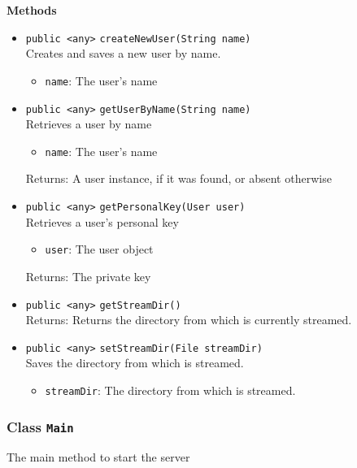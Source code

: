 \textbf{Methods}
\begin{itemize}
\item \lstinline|public <any>| \lstinline|createNewUser|\lstinline|(String name)|\\
Creates and saves a new user by name.
\begin{itemize}
\item \lstinline|name|: The user's name
\end{itemize}



\item \lstinline|public <any>| \lstinline|getUserByName|\lstinline|(String name)|\\
Retrieves a user by name
\begin{itemize}
\item \lstinline|name|: The user's name
\end{itemize}

Returns: A user instance, if it was found, or absent otherwise

\item \lstinline|public <any>| \lstinline|getPersonalKey|\lstinline|(User user)|\\
Retrieves a user's personal key
\begin{itemize}
\item \lstinline|user|: The user object
\end{itemize}

Returns: The private key

\item \lstinline|public <any>| \lstinline|getStreamDir|\lstinline|()|\\
Returns: Returns the directory from which is currently streamed.



\item \lstinline|public <any>| \lstinline|setStreamDir|\lstinline|(File streamDir)|\\
Saves the directory from which is streamed.
\begin{itemize}
\item \lstinline|streamDir|: The directory from which is streamed.
\end{itemize}



\end{itemize}

\subsubsection{Class \lstinline|Main|}
The main method to start the server \\




